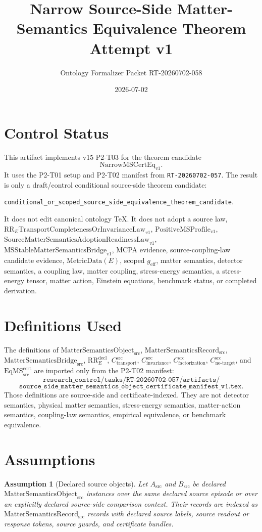 \documentclass[11pt]{article}
\title{Narrow Source-Side Matter-Semantics Equivalence Theorem Attempt v1}
\author{Ontology Formalizer Packet RT-20260702-058}
\date{2026-07-02}
\newcommand{\MSObj}{\mathrm{MatterSemanticsObject}_{\mathrm{src}}}
\newcommand{\MSRec}{\mathrm{MatterSemanticsRecord}_{\mathrm{src}}}
\newcommand{\MSBridgeSrc}{\mathrm{MatterSemanticsBridge}_{\mathrm{src}}}
\newcommand{\RREObj}{\mathrm{RR}_{E}^{\mathrm{decl}}}
\newcommand{\CTr}{C_{\mathrm{transport}}^{\mathrm{src}}}
\newcommand{\CInv}{C_{\mathrm{invariance}}^{\mathrm{src}}}
\newcommand{\CFact}{C_{\mathrm{factorization}}^{\mathrm{src}}}
\newcommand{\CNTI}{C_{\mathrm{no\text{-}target}}^{\mathrm{src}}}
\newcommand{\EqMS}{\mathrm{EqMS}_{\mathrm{src}}^{\mathrm{cert}}}
\newcommand{\PositiveMSProfile}{\mathrm{PositiveMSProfile}_{v1}}
\newcommand{\SMSAR}{\mathrm{SourceMatterSemanticsAdoptionReadinessLaw}_{v1}}
\newcommand{\LawRR}{\mathrm{RR}_{E}\mathrm{TransportCompletenessOrInvarianceLaw}_{v1}}
\newcommand{\MSStable}{\mathrm{MSStableMatterSemanticsBridge}_{v1}}
\newcommand{\MetricData}{\mathrm{MetricData}}
\newcommand{\geff}{g_{\mathrm{eff}}}
\newtheorem{assumption}{Assumption}
\begin{document}
\maketitle

\section{Control Status}

This artifact implements v15 P2-T03 for the theorem candidate
\[
  \mathrm{NarrowMSCertEq}_{v1}.
\]
It uses the P2-T01 setup and P2-T02 manifest from \texttt{RT-20260702-057}.
The result is only a draft/control conditional source-side theorem candidate:

\begin{center}
\texttt{conditional\_or\_scoped\_source\_side\_equivalence\_theorem\_candidate}.
\end{center}

It does not edit canonical ontology TeX. It does not adopt a source law,
\(\LawRR\), \(\PositiveMSProfile\), \(\SMSAR\), \(\MSStable\), MCPA evidence,
source-coupling-law candidate evidence, \(\MetricData(E)\), scoped \(\geff\),
matter semantics, detector semantics, a coupling law, matter coupling,
stress-energy semantics, a stress-energy tensor, matter action, Einstein
equations, benchmark status, or completed derivation.

\section{Definitions Used}

The definitions of \(\MSObj\), \(\MSRec\), \(\MSBridgeSrc\), \(\RREObj\),
\(\CTr\), \(\CInv\), \(\CFact\), \(\CNTI\), and \(\EqMS\) are imported only
from the P2-T02 manifest:
\[
\texttt{research\_control/tasks/RT-20260702-057/artifacts/}
\]
\[
\texttt{source\_side\_matter\_semantics\_object\_certificate\_manifest\_v1.tex}.
\]
Those definitions are source-side and certificate-indexed. They are not
detector semantics, physical matter semantics, stress-energy semantics,
matter-action semantics, coupling-law semantics, empirical equivalence, or
benchmark equivalence.

\section{Assumptions}

\begin{assumption}[Declared source objects]
Let \(A_{\mathrm{src}}\) and \(B_{\mathrm{src}}\) be declared
\(\MSObj\) instances over the same declared source episode or over an
explicitly declared source-side comparison context. Their records are indexed
as \(\MSRec\) records with declared source labels, source readout or response
tokens, source guards, and certificate bundles.
\end{assumption}
\end{document}
